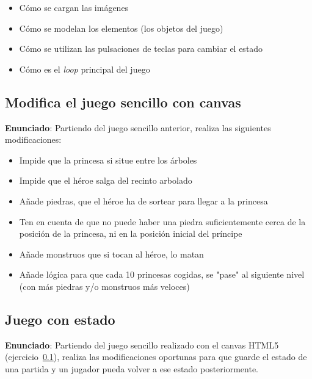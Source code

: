 \begin{itemize}
  \item Cómo se cargan las imágenes
  \item Cómo se modelan los elementos (los objetos del juego)
  \item Cómo se utilizan las pulsaciones de teclas para cambiar el estado
  \item Cómo es el \emph{loop} principal del juego
\end{itemize}

\subsection{Modifica el juego sencillo con canvas}
\label{subsec:modifica-juego}

\textbf{Enunciado}: Partiendo del juego sencillo anterior, realiza las 
siguientes modificaciones:

\begin{itemize}
  \item Impide que la princesa si situe entre los árboles
  \item Impide que el héroe salga del recinto arbolado
  \item Añade piedras, que el héroe ha de sortear para llegar a la princesa
  \item Ten en cuenta de que no puede haber una piedra suficientemente cerca de la posición de la princesa, ni en la posición inicial del príncipe
  \item Añade monstruos que si tocan al héroe, lo matan
  \item Añade lógica para que cada 10 princesas cogidas, se "pase" al siguiente
nivel (con más piedras y/o monstruos más veloces)
\end{itemize}

\subsection{Juego con estado}
\label{subsec:juego-con-estado}

\textbf{Enunciado}: Partiendo del juego sencillo realizado con el canvas HTML5 (ejercicio~\ref{subsec:modifica-juego}), realiza las modificaciones oportunas para que guarde el estado de una partida y un jugador pueda volver a ese estado posteriormente.

